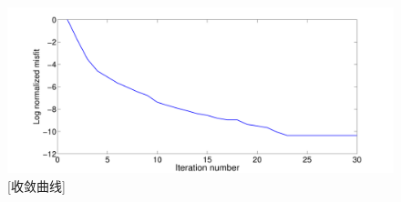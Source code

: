 \begin{figure}[!htbp]
    \centering
    {\includegraphics[width=1.0\linewidth]{figure/misfit}}
    [收敛曲线]
    \label{fig:misfit_model}
\end{figure}

